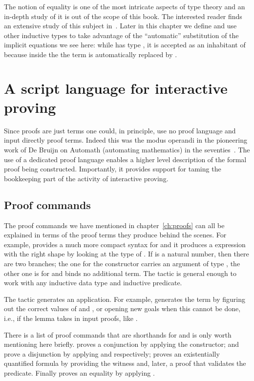 The notion of equality is one of the most intricate aspects of type
theory and an in-depth study of it is out of the scope of this book.  The interested reader
finds an extensive study of this subject in~\cite{hottbook}.  Later in this
chapter we define and use other inductive types to take advantage
of the ``automatic'' substitution of the implicit equations we see here:
while  has type , it is accepted as an
inhabitant of  because inside the  the term 
is automatically replaced by .

\section{A script language for interactive proving}


Since proofs are just terms one could,
in principle, use no proof language and input directly proof terms.
Indeed this was the modus operandi in the pioneering work of
De Bruijn on Automath (automating mathematics) in the seventies~\cite{nederpelt-94}.
The use of a dedicated proof language enables a higher level
description of the formal proof being constructed. Importantly, it
provides support for taming the bookkeeping part of the activity of
interactive proving.

\subsection{Proof commands}
  The proof commands we have mentioned in chapter~\ref{ch:proofs} can all be
explained in terms of the proof terms they produce behind the scenes.
For example,  provides a much more compact syntax
for  and it produces a
 expression with the right
shape by looking at the type of .  If  is a natural number, then there
are two branches; the one for the  constructor carries an argument of type
, the other one is for  and binds no additional term.
The  tactic is general enough to work with any inductive data type
and inductive predicate.

The  tactic generates an application.  For example, 
generates the term  by figuring out the correct values of
 and , or opening new goals when this cannot be done, i.e.,
if the lemma takes in input proofs, like .

There is a list of proof commands that are shorthands for 
and is only worth mentioning here briefly.  proves a conjunction
by applying the  constructor;  and  prove a
disjunction by applying  and  respectively;
 proves an existentially quantified formula by providing
the witness  and, later, a proof that  validates the predicate.
Finally  proves an equality by applying .


